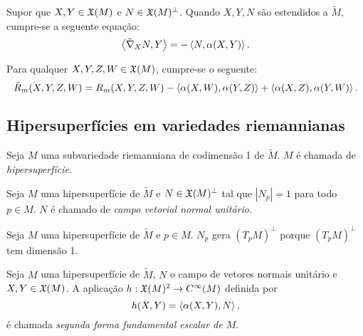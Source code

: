 \begin{lema}
	Supor que $X,Y \in \mathfrak{X}(M)$ e $N \in \mathfrak{X}(M)^\perp$. Quando $X,Y,N$ são estendidos a $\tilde{M}$, cumpre-se a seguente equação:
	\begin{equation*}
		\left\langle \tilde{\nabla}_X N,Y \right\rangle = -\left\langle N,\alpha(X,Y) \right\rangle.
	\end{equation*}
\end{lema}

\begin{teorema}\label{equacao-de-gauss}
	Para qualquer $X,Y,Z,W \in \mathfrak{X}(M)$, cumpre-se o seguente:
	\begin{equation*}
		\tilde{R}_m(X,Y,Z,W) = R_m(X,Y,Z,W) - \left\langle \alpha(X,W),\alpha(Y,Z) \right\rangle + \left\langle \alpha(X,Z),\alpha(Y,W) \right\rangle.
	\end{equation*}
\end{teorema}

\subsection{Hipersuperfícies em variedades riemannianas}

\begin{definicao}
	Seja $M$ uma subvariedade riemanniana de codimensão 1 de $\tilde{M}$. $M$ é chamada de \emph{hipersuperfície}.
\end{definicao}

\begin{definicao}
	Seja $M$ uma hipersuperfície de $\tilde{M}$ e
	$N \in \mathfrak{X}(M)^\perp$ tal que $|N_p|=1$ para todo $p \in M$.
	$N$ é chamado de \emph{campo vetorial normal unitário}.
\end{definicao}
	
\begin{observacao}
	Seja $M$ uma hipersuperfície de $\tilde{M}$ e 
	$p \in M$.
	$N_p$ gera $\left(T_p M\right)^\perp$ porque $\left(T_p M\right)^\perp$ tem dimensão 1.
\end{observacao}

\begin{definicao}
	Seja $M$ uma hipersuperfície de $\tilde{M}$,
	$N$ o campo de vetores normais unitário e
	$X,Y \in \mathfrak{X}(M)$.
	A aplicação $h: \mathfrak{X}(M)^2 \rightarrow C^\infty(M)$ definida por
	\begin{equation*}
		h(X,Y) = \left\langle \alpha(X,Y),N \right\rangle,
	\end{equation*}
	é chamada \emph{segunda forma fundamental escalar de $M$}.
\end{definicao}

